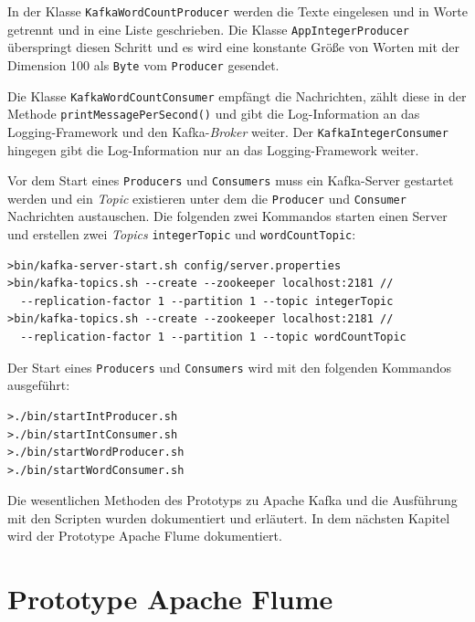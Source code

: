 In der Klasse \texttt{KafkaWordCountProducer} werden die Texte eingelesen und in Worte getrennt und in eine Liste geschrieben. Die Klasse \texttt{AppIntegerProducer} überspringt diesen Schritt und es wird eine konstante Größe von Worten mit der Dimension 100 als \texttt{Byte} vom \texttt{Producer} gesendet.

Die Klasse \texttt{KafkaWordCountConsumer} empfängt die Nachrichten, zählt diese in der Methode \texttt{printMessagePerSecond()} und gibt die Log-Information an das Logging-Framework und den Kafka-\textit{Broker} weiter. Der \texttt{KafkaIntegerConsumer} hingegen gibt die Log-Information nur an das Logging-Framework weiter.

Vor dem Start eines \texttt{Producers} und \texttt{Consumers} muss ein Kafka-Server gestartet werden und ein \textit{Topic} existieren unter dem die \texttt{Producer} und \texttt{Consumer} Nachrichten austauschen. Die folgenden zwei Kommandos starten einen Server und erstellen zwei \textit{Topics} \texttt{integerTopic} und \texttt{wordCountTopic}:

\begin{verbatim}
>bin/kafka-server-start.sh config/server.properties
>bin/kafka-topics.sh --create --zookeeper localhost:2181 // 
  --replication-factor 1 --partition 1 --topic integerTopic
>bin/kafka-topics.sh --create --zookeeper localhost:2181 // 
  --replication-factor 1 --partition 1 --topic wordCountTopic
\end{verbatim}

Der Start eines \texttt{Producers} und \texttt{Consumers} wird mit den folgenden Kommandos ausgeführt:

\begin{verbatim}
>./bin/startIntProducer.sh
>./bin/startIntConsumer.sh
>./bin/startWordProducer.sh
>./bin/startWordConsumer.sh
\end{verbatim}

Die wesentlichen Methoden des Prototyps zu Apache Kafka und die Ausführung mit den Scripten wurden dokumentiert und erläutert. In dem nächsten Kapitel wird der Prototype Apache Flume dokumentiert.


\section{Prototype Apache Flume}
\label{sec:prot:flume}

